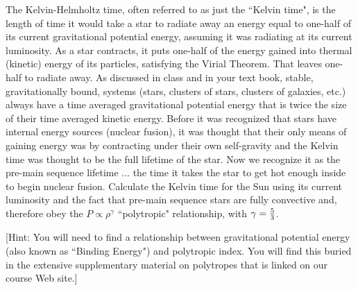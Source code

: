 \documentclass[12pt]{article}
\newenvironment{problem}[2][Problem]{\begin{trivlist}
\item[\hskip \labelsep {\bfseries #1}\hskip \labelsep {\bfseries #2.}]}{\end{trivlist}}
\begin{document}
\begin{problem}{2}
The Kelvin-Helmholtz time, often referred to as just the ``Kelvin time", is the length of time it would take a star to radiate away an energy equal to one-half of its current gravitational potential energy, assuming it was radiating at its current luminosity. As a star contracts, it puts one-half of the energy gained into thermal (kinetic) energy of its particles, satisfying the Virial Theorem. That leaves one-half to radiate away. As discussed in class and in your text book, stable, gravitationally bound, systems (stars, clusters of stars, clusters of galaxies, etc.) always have a time averaged gravitational potential energy that is twice the size of their time averaged kinetic energy. Before it was recognized that stars have internal energy sources (nuclear fusion), it was thought that their only means of gaining energy was by contracting under their own self-gravity and the Kelvin time was thought to be the full lifetime of the star. Now we recognize it as the pre-main sequence lifetime ... the time it takes the star to get hot enough inside to begin nuclear fusion. Calculate the Kelvin time for the Sun using its current luminosity and the fact that pre-main sequence stars are fully convective and, therefore obey the $P \propto \rho^\gamma$ ``polytropic" relationship, with $\gamma = {5 \over 3}$.

\bigskip

[Hint: You will need to find a relationship between gravitational potential energy (also known as ``Binding Energy") and polytropic index. You will find this buried in the extensive supplementary material on polytropes that is linked on our course Web site.]
\end{problem}
\end{document}
